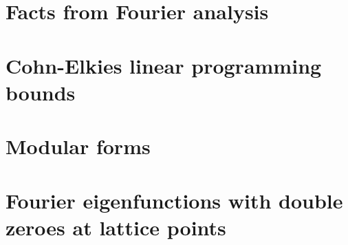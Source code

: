 \pagebreak
\section{Facts from Fourier analysis}  %


\pagebreak
\section{Cohn-Elkies linear programming bounds}


\pagebreak
\section{Modular forms}


\pagebreak
\section{Fourier eigenfunctions with double zeroes at lattice points}\label{sec: fourier double zeroes}





